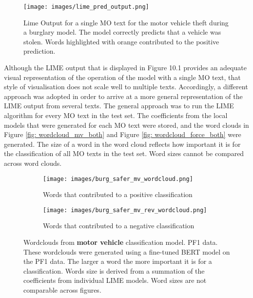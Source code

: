 \begin{figure}[!tbp]
  \centering
    \texttt{[image: images/lime\_pred\_output.png]}
    \caption[Lime Output for a single MO text for the motor vehicle theft during a burglary model.]{ Lime Output for a single MO text for the motor vehicle theft during a burglary model. The model correctly predicts that a vehicle was stolen. Words highlighted with orange contributed to the positive prediction.}
    \label{fig:lime_out1}
\end{figure}



Although the LIME output that is displayed in Figure 10.1 provides an adequate visual representation of the operation of the model with a single MO text, that style of visualisation does not scale well to multiple texts. Accordingly, a different approach was adopted in order to arrive at a more general representation of the LIME output from several texts. The general approach was to run the LIME algorithm for every MO text in the test set. The coefficients from the local models that were generated for each MO text were stored, and the word clouds in Figure \ref{fig: wordcloud_mv_both}  and Figure \ref{fig: wordcloud_force_both} were generated. The size of a word in the word cloud reflects how important it is for the classification of all MO texts in the test set. Word sizes cannot be compared across word clouds.  



\begin{figure}
     \centering
     \begin{subfigure}[b]{0.9\textwidth}
         \centering
         \texttt{[image: images/burg\_safer\_mv\_wordcloud.png]}
         \caption{Words that contributed to a positive classification}
         \label{fig: wordcloud_mv}
     \end{subfigure}
     \vfill
     \begin{subfigure}[b]{0.9\textwidth}
         \centering
         \texttt{[image: images/burg\_safer\_mv\_rev\_wordcloud.png]}
         \caption{Words that contributed to a negative classification}
         \label{fig: wordcloud_mv_rev}
     \end{subfigure}
        \caption[Wordclouds from  \textbf{motor vehicle} classification model. PF1 data.]{Wordclouds from  \textbf{motor vehicle} classification model. PF1 data. These wordclouds were generated using a fine-tuned BERT model on the PF1 data. The larger a word the more important it is for a classification. Words size is derived from a summation of the coefficients from individual LIME models. Word sizes are not comparable across figures.}
        \label{fig:wordcloud_mv_both}
        
\end{figure}


